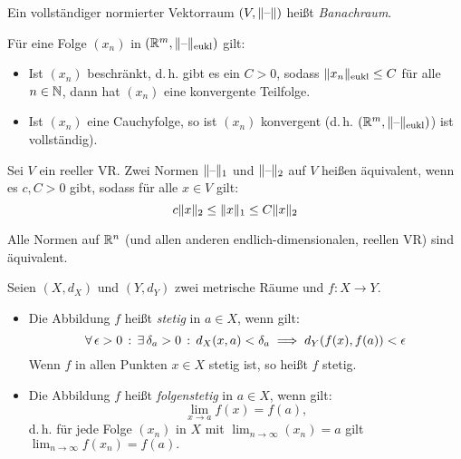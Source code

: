 \documentclass{cheat-sheet}
\begin{document}
\begin{defn}
  Ein vollständiger normierter Vektorraum $(V, \lVert\text{--}\rVert)$ heißt \emph{Banachraum}.
\end{defn}


\begin{satz}
  Für eine Folge $(x_n)$ in $(\mathbb{R}^m, \lVert\text{--}\rVert_{\text{eukl}})$ gilt:

  \begin{itemize}
    \item Ist $(x_n)$ beschränkt, d.\,h. gibt es ein $C > 0$, sodass $\lVert x_n\rVert_{\text{eukl}} \le C$ für alle $n \in \mathbb{N}$, dann hat $(x_n)$ eine konvergente Teilfolge.
    \item Ist $(x_n)$ eine Cauchyfolge, so ist $(x_n)$ konvergent (d.\,h. $(\mathbb{R}^m, \lVert\text{--}\rVert_{\text{eukl}})$) ist vollständig).
  \end{itemize}
\end{satz}

\begin{defn}
  Sei $V$ ein reeller VR. Zwei Normen $\lVert\text{--}\rVert_1$ und $\lVert\text{--}\rVert_2$ auf $V$ heißen äquivalent, wenn es $c, C > 0$ gibt, sodass für alle $x \in V$ gilt:
  \[ c \lVert x\rVert_2 \le \lVert x\rVert_1 \le C \lVert x\rVert_2 \]
\end{defn}


\begin{satz}
  Alle Normen auf $\mathbb{R}^n$ (und allen anderen endlich-dimensionalen, reellen VR) sind äquivalent.
\end{satz}

\begin{defn}
  Seien $(X, d_X)$ und $(Y, d_Y)$ zwei metrische Räume und $f : X \to Y$.
  \begin{itemize}
    \item Die Abbildung $f$ heißt \emph{stetig} in $a \in X$, wenn gilt:
    \[ \forall \, {\epsilon > 0} \,:\, \exists \, {\delta_a > 0} \,:\, d_X(x, a) < \delta_a \implies d_Y(f(x), f(a)) < \epsilon \]
    Wenn $f$ in allen Punkten $x \in X$ stetig ist, so heißt $f$ stetig.
    \item Die Abbildung $f$ heißt \emph{folgenstetig} in $a \in X$, wenn gilt:
    \[ \lim_{x \to a} f(x) = f(a), \]
    d.\,h. für jede Folge $(x_n)$ in $X$ mit $\lim_{n \to \infty} (x_n) = a$ gilt $\lim_{n \to \infty} f(x_n) = f(a).$
  \end{itemize}
\end{defn}
\end{document}
